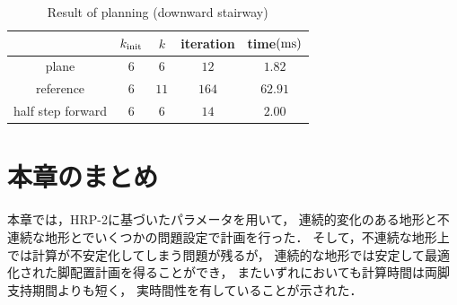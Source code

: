 \documentclass[autodetect-engine,dvipdfmx-if-dvi,ja=standard,a4j,jbase=11pt,magstyle=nomag*]{bxjsreport}
\begin{document}
\begin{table}[pt]%
    \caption{Result of planning (downward stairway)}%
    \label{tab:sim_hrp2_stair_down}%
    \centering%
    \begin{tabular}{ccccc}%
        \toprule%
                            &   $k_{\mathrm{init}}$ &   $k$     &   iteration   &   time$(\si{\milli\second})$ \\%
        \midrule%
        plane               &   $6$         &   $6$     &   $12$        &   $1.82$ \\%
        reference           &   $6$         &   $11$    &   $164$       &   $62.91$ \\%
        half step forward   &   $6$         &   $6$     &   $14$        &   $2.00$ \\%
        \bottomrule%
    \end{tabular}%
\end{table}

\section{本章のまとめ}
本章では，HRP-2に基づいたパラメータを用いて，
連続的変化のある地形と不連続な地形とでいくつかの問題設定で計画を行った．
そして，不連続な地形上では計算が不安定化してしまう問題が残るが，
連続的な地形では安定して最適化された脚配置計画を得ることができ，
またいずれにおいても計算時間は両脚支持期間よりも短く，
実時間性を有していることが示された．
\end{document}
